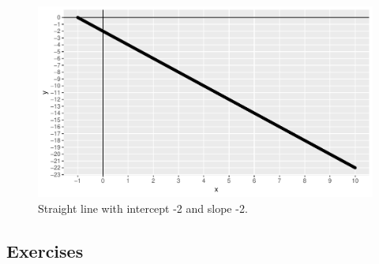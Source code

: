 \documentclass[]{report}\usepackage[]{graphicx}\usepackage[]{color}
\makeatletter
\def\maxwidth{ %
  \ifdim\Gin@nat@width>\linewidth
    \linewidth
  \else
    \Gin@nat@width
  \fi
}
\newenvironment{knitrout}{}{} %
\makeatother
\begin{document}
\begin{knitrout}
\color{fgcolor}\begin{figure}

{\centering \includegraphics[width=\maxwidth]{figure/lm_3-1} 

}

\caption[Straight line with intercept -2 and slope -2]{Straight line with intercept -2 and slope -2.}\label{fig:lm_3}
\end{figure}


\end{knitrout}

\subsection{Exercises}
\end{document}
